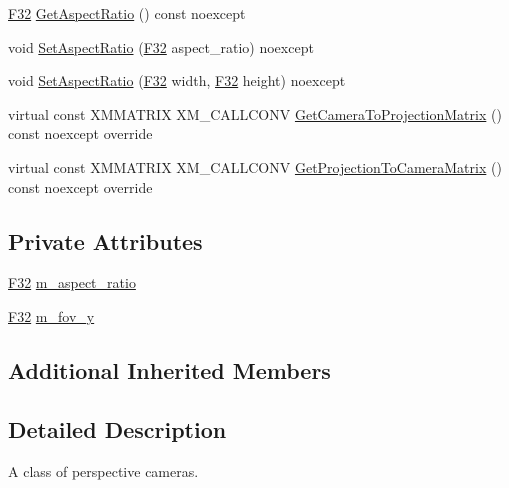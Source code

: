 \begin{DoxyCompactItemize}
\item 
\mbox{\hyperlink{namespacemage_aa97e833b45f06d60a0a9c4fc22ae02c0}{F32}} \mbox{\hyperlink{classmage_1_1rendering_1_1_perspective_camera_a835369a1652074eed3a7d09e01a40430}{Get\+Aspect\+Ratio}} () const noexcept
\item 
void \mbox{\hyperlink{classmage_1_1rendering_1_1_perspective_camera_a180f74e8b39609aee8dcc2741a74076f}{Set\+Aspect\+Ratio}} (\mbox{\hyperlink{namespacemage_aa97e833b45f06d60a0a9c4fc22ae02c0}{F32}} aspect\+\_\+ratio) noexcept
\item 
void \mbox{\hyperlink{classmage_1_1rendering_1_1_perspective_camera_a09a93f5281723ec6ccf1adf636619e60}{Set\+Aspect\+Ratio}} (\mbox{\hyperlink{namespacemage_aa97e833b45f06d60a0a9c4fc22ae02c0}{F32}} width, \mbox{\hyperlink{namespacemage_aa97e833b45f06d60a0a9c4fc22ae02c0}{F32}} height) noexcept
\item 
virtual const X\+M\+M\+A\+T\+R\+IX X\+M\+\_\+\+C\+A\+L\+L\+C\+O\+NV \mbox{\hyperlink{classmage_1_1rendering_1_1_perspective_camera_af0892905a0030fc70bdc629007cde5a0}{Get\+Camera\+To\+Projection\+Matrix}} () const noexcept override
\item 
virtual const X\+M\+M\+A\+T\+R\+IX X\+M\+\_\+\+C\+A\+L\+L\+C\+O\+NV \mbox{\hyperlink{classmage_1_1rendering_1_1_perspective_camera_af049c6330ebdaa822bfd31dc88f25ac2}{Get\+Projection\+To\+Camera\+Matrix}} () const noexcept override
\end{DoxyCompactItemize}
\subsection*{Private Attributes}
\begin{DoxyCompactItemize}
\item 
\mbox{\hyperlink{namespacemage_aa97e833b45f06d60a0a9c4fc22ae02c0}{F32}} \mbox{\hyperlink{classmage_1_1rendering_1_1_perspective_camera_a28abd925a9694954dcd26a4c16b6ac6d}{m\+\_\+aspect\+\_\+ratio}}
\item 
\mbox{\hyperlink{namespacemage_aa97e833b45f06d60a0a9c4fc22ae02c0}{F32}} \mbox{\hyperlink{classmage_1_1rendering_1_1_perspective_camera_afa70744921fce139d518730f998bd566}{m\+\_\+fov\+\_\+y}}
\end{DoxyCompactItemize}
\subsection*{Additional Inherited Members}


\subsection{Detailed Description}
A class of perspective cameras. 

